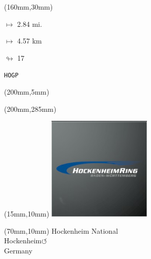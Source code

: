 \begin{textblock*}{40mm}(160mm,30mm)%
\Large
\par$\mapsto$ 2.84 mi.
\par$\mapsto$ 4.57 km
\par$\looparrowright$ 17
\par\hfill\tiny\tt HOGP\\
\end{textblock*}
\begin{textblock*}{20mm}(200mm,5mm)%
\fbox{\thepage}
\label{HOGP}
\end{textblock*}
\begin{textblock*}{20mm}(200mm,285mm)%
\fbox{\thepage}
\end{textblock*}

\null\newpage
\begin{textblock*}{50mm}(15mm,10mm)%
\includegraphics[width=50mm]{LG/2015-05-20_00082.png}
\end{textblock*}
\begin{textblock*}{130mm}(70mm,10mm)%
{\fontsize{20}{20}\selectfont Hockenheim National\\}
{\fontsize{16}{16}\selectfont Hockenheim\hfill \huge$\circlearrowleft$\\}
{\fontsize{12}{12}\selectfont Germany\\}
\end{textblock*}
